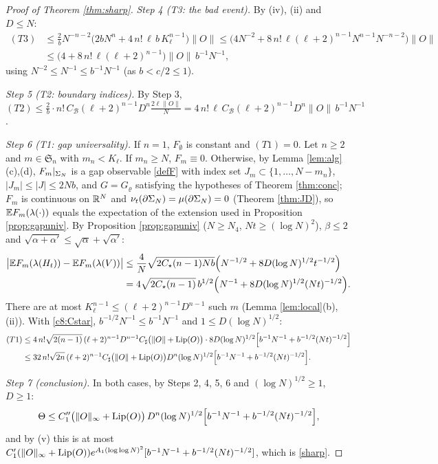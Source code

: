 \begin{proof}[Proof of Theorem \ref{thm:sharp}]
\emph{Step 4 (T3: the bad event).} By (iv), (ii) and $D\le N$:
\[
\begin{aligned}
(T3)&\le\frac2bN^{-n-2}\big(2bN^n+4\,n!\,\ell\,b\,K_\ell^{n-1}\big)\|O\|\le\big(4N^{-2}+8\,n!\,\ell(\ell+2)^{n-1}N^{n-1}N^{-n-2}\big)\|O\|\\
&\le\big(4+8\,n!\,\ell(\ell+2)^{n-1}\big)\|O\|\,b^{-1}N^{-1},
\end{aligned}
\]
using $N^{-2}\le N^{-1}\le b^{-1}N^{-1}$ (as $b<c/2\le1$).

\emph{Step 5 (T2: boundary indices).} By Step 3, $(T2)\le\frac2b\cdot n!\,C_{\mathcal B}(\ell+2)^{n-1}D^n\frac{2\ell\|O\|}N=4\,n!\,\ell\,C_{\mathcal B}(\ell+2)^{n-1}D^n\|O\|\,b^{-1}N^{-1}$.

\emph{Step 6 (T1: gap universality).} If $n=1$, $F_\emptyset$ is constant and $(T1)=0$. Let $n\ge2$ and $m\in\mathfrak S_n$ with $m_n<K_\ell$. If $m_n\ge N$, $F_m\equiv0$. Otherwise, by Lemma \ref{lem:alg}(c),(d), $F_m|_{\Sigma_N}$ is a gap observable \eqref{defF} with index set $J_m\subset\{1,\dots,N-m_n\}$, $|J_m|\le|J|\le2Nb$, and $G=G_\varrho$ satisfying the hypotheses of Theorem \ref{thm:conc}; $F_m$ is continuous on $\mathbb{R}^N$ and $\nu_t(\partial\Sigma_N)=\mu(\partial\Sigma_N)=0$ (Theorem \ref{thm:JD}), so $\mathbb{E} F_m(\lambda(\cdot))$ equals the expectation of the extension used in Proposition \ref{prop:gapuniv}. By Proposition \ref{prop:gapuniv} ($N\ge N_4$, $Nt\ge(\log N)^2$), $\beta\le2$ and $\sqrt{\alpha+\alpha'}\le\sqrt\alpha+\sqrt{\alpha'}$:
\[
\begin{aligned}
\big|\mathbb{E} F_m(\lambda(H_t))-\mathbb{E} F_m(\lambda(V))\big|&\le\frac4N\sqrt{2C_\star(n-1)Nb}\Big(N^{-1/2}+8D(\log N)^{1/2}t^{-1/2}\Big)\\&=4\sqrt{2C_\star(n-1)}\,b^{1/2}\Big(N^{-1}+8D(\log N)^{1/2}(Nt)^{-1/2}\Big).
\end{aligned}
\]
There are at most $K_\ell^{n-1}\le(\ell+2)^{n-1}D^{n-1}$ such $m$ (Lemma \ref{lem:local}(b), (ii)). With \eqref{c8:Cstar}, $b^{-1/2}N^{-1}\le b^{-1}N^{-1}$ and $1\le D(\log N)^{1/2}$:
\[
\begin{aligned}
(T1)&\le4\,n!\sqrt{2(n-1)}\,(\ell+2)^{n-1}D^{n-1}C_\sharp\big(\|O\|+\operatorname{Lip}(O)\big)\cdot8D(\log N)^{1/2}\Big[b^{-1}N^{-1}+b^{-1/2}(Nt)^{-1/2}\Big]\\
&\le32\,n!\sqrt{2n}\,(\ell+2)^{n-1}C_\sharp\big(\|O\|+\operatorname{Lip}(O)\big)D^n(\log N)^{1/2}\Big[b^{-1}N^{-1}+b^{-1/2}(Nt)^{-1/2}\Big].
\end{aligned}
\]

\emph{Step 7 (conclusion).} In both cases, by Steps 2, 4, 5, 6 and $(\log N)^{1/2}\ge1$, $D\ge1$:
\[
\Theta\le C_1''\big(\|O\|_\infty+\operatorname{Lip}(O)\big)\,D^n(\log N)^{1/2}\Big[b^{-1}N^{-1}+b^{-1/2}(Nt)^{-1/2}\Big],
\]
and by (v) this is at most $C_1'(\|O\|_\infty+\operatorname{Lip}(O))e^{A_1(\log\log N)^2}[b^{-1}N^{-1}+b^{-1/2}(Nt)^{-1/2}]$, which is \eqref{sharp}.
\end{proof}

